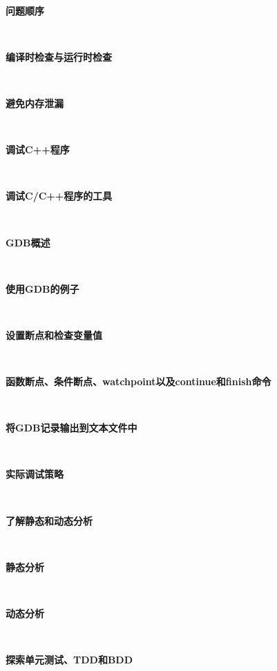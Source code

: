 \noindent\textbf{}\ \par
\textbf{问题顺序} \ \par

\noindent\textbf{}\ \par
\textbf{编译时检查与运行时检查} \ \par

\noindent\textbf{}\ \par
\textbf{避免内存泄漏} \ \par

\noindent\textbf{}\ \par
\textbf{调试C++程序} \ \par

\noindent\textbf{}\ \par
\textbf{调试C/C++程序的工具} \ \par

\noindent\textbf{}\ \par
\textbf{GDB概述} \ \par

\noindent\textbf{}\ \par
\textbf{使用GDB的例子} \ \par

\noindent\textbf{}\ \par
\textbf{设置断点和检查变量值} \ \par

\noindent\textbf{}\ \par
\textbf{函数断点、条件断点、watchpoint以及continue和finish命令} \ \par

\noindent\textbf{}\ \par
\textbf{将GDB记录输出到文本文件中} \ \par

\noindent\textbf{}\ \par
\textbf{实际调试策略} \ \par

\noindent\textbf{}\ \par
\textbf{了解静态和动态分析} \ \par

\noindent\textbf{}\ \par
\textbf{静态分析} \ \par

\noindent\textbf{}\ \par
\textbf{动态分析} \ \par

\noindent\textbf{}\ \par
\textbf{探索单元测试、TDD和BDD} \ \par

